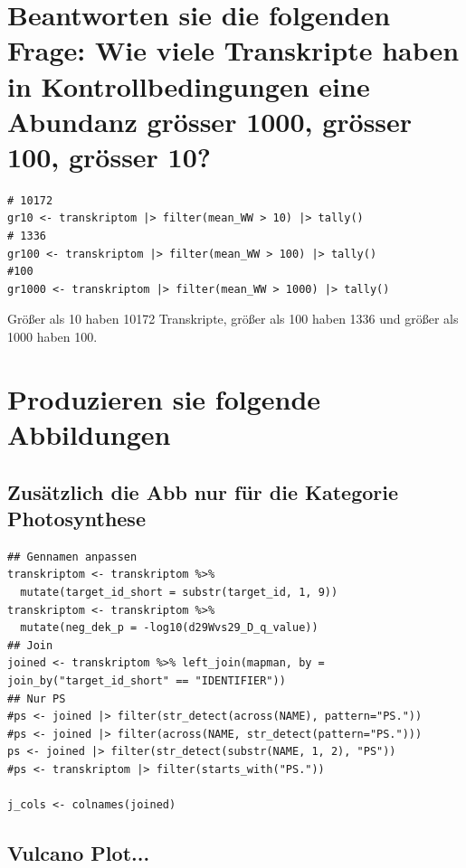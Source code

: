 \documentclass[11pt,a4paper]{article}
\begin{document}
    \section{Beantworten sie die folgenden Frage: Wie viele Transkripte haben in Kontrollbedingungen eine Abundanz grösser 1000, grösser 100, grösser 10?}
    \begin{verbatim}
# 10172
gr10 <- transkriptom |> filter(mean_WW > 10) |> tally()
# 1336
gr100 <- transkriptom |> filter(mean_WW > 100) |> tally()
#100
gr1000 <- transkriptom |> filter(mean_WW > 1000) |> tally()
    \end{verbatim}

    Größer als 10 haben 10172 Transkripte, größer als 100 haben 1336 und größer als 1000 haben 100.

    \section{Produzieren sie folgende Abbildungen}
    \subsection{Zusätzlich die Abb nur für die Kategorie Photosynthese}
    \begin{verbatim}
## Gennamen anpassen
transkriptom <- transkriptom %>%
  mutate(target_id_short = substr(target_id, 1, 9))
transkriptom <- transkriptom %>%
  mutate(neg_dek_p = -log10(d29Wvs29_D_q_value))
## Join
joined <- transkriptom %>% left_join(mapman, by = join_by("target_id_short" == "IDENTIFIER"))
## Nur PS
#ps <- joined |> filter(str_detect(across(NAME), pattern="PS."))
#ps <- joined |> filter(across(NAME, str_detect(pattern="PS.")))
ps <- joined |> filter(str_detect(substr(NAME, 1, 2), "PS"))
#ps <- transkriptom |> filter(starts_with("PS."))

j_cols <- colnames(joined)
    \end{verbatim}

    \subsection{Vulcano Plot...}
\end{document}
